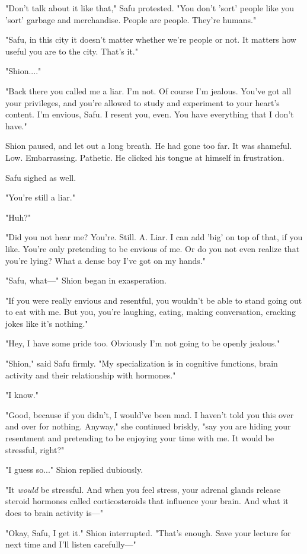 "Don't talk about it like that," Safu protested. "You don't 'sort'
people like you 'sort' garbage and merchandise. People are people.
They're humans."

"Safu, in this city it doesn't matter whether we're people or not. It
matters how useful you are to the city. That's it."

"Shion...."

"Back there you called me a liar. I'm not. Of course I'm jealous. You've
got all your privileges, and you're allowed to study and experiment to
your heart's content. I'm envious, Safu. I resent you, even. You have
everything that I don't have."

Shion paused, and let out a long breath. He had gone too far. It was
shameful. Low. Embarrassing. Pathetic. He clicked his tongue at himself
in frustration.

Safu sighed as well.

"You're still a liar."

"Huh?"

"Did you not hear me? You're. Still. A. Liar. I can add 'big' on top of
that, if you like. You're only pretending to be envious of me. Or do you
not even realize that you're lying? What a dense boy I've got on my
hands."

"Safu, what---" Shion began in exasperation.

"If you were really envious and resentful, you wouldn't be able to stand
going out to eat with me. But you, you're laughing, eating, making
conversation, cracking jokes like it's nothing."

"Hey, I have some pride too. Obviously I'm not going to be openly
jealous."

"Shion," said Safu firmly. "My specialization is in cognitive functions,
brain activity and their relationship with hormones."

"I know."

"Good, because if you didn't, I would've been mad. I haven't told you
this over and over for nothing. Anyway," she continued briskly, "say you
are hiding your resentment and pretending to be enjoying your time with
me. It would be stressful, right?"

"I guess so..." Shion replied dubiously.

"It \emph{would} be stressful. And when you feel stress, your adrenal glands
release steroid hormones called corticosteroids that influence your
brain. And what it does to brain activity is---"

"Okay, Safu, I get it." Shion interrupted. "That's enough. Save your
lecture for next time and I'll listen carefully---"

